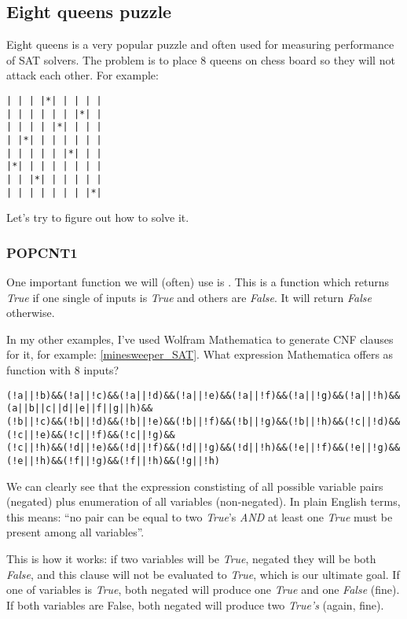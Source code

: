 \subsection{Eight queens puzzle}
\label{EightQueens}

Eight queens is a very popular puzzle and often used for measuring performance of SAT solvers.
The problem is to place 8 queens on chess board so they will not attack each other.
For example:

\begin{lstlisting}
| | | |*| | | | |
| | | | | | |*| |
| | | | |*| | | |
| |*| | | | | | |
| | | | | |*| | |
|*| | | | | | | |
| | |*| | | | | |
| | | | | | | |*|
\end{lstlisting}

Let's try to figure out how to solve it.

\subsubsection{POPCNT1}

One important function we will (often) use is .
This is a function which returns \textit{True} if one single of inputs is \textit{True} and others are \textit{False}.
It will return \textit{False} otherwise.

In my other examples, I've used Wolfram Mathematica to generate CNF clauses for it, for example: \ref{minesweeper_SAT}.
What expression Mathematica offers as  function with 8 inputs?

\begin{lstlisting}
(!a||!b)&&(!a||!c)&&(!a||!d)&&(!a||!e)&&(!a||!f)&&(!a||!g)&&(!a||!h)&&(a||b||c||d||e||f||g||h)&&
(!b||!c)&&(!b||!d)&&(!b||!e)&&(!b||!f)&&(!b||!g)&&(!b||!h)&&(!c||!d)&&(!c||!e)&&(!c||!f)&&(!c||!g)&&
(!c||!h)&&(!d||!e)&&(!d||!f)&&(!d||!g)&&(!d||!h)&&(!e||!f)&&(!e||!g)&&(!e||!h)&&(!f||!g)&&(!f||!h)&&(!g||!h)
\end{lstlisting}

We can clearly see that the expression constisting of all possible variable pairs (negated) plus
enumeration of all variables (non-negated).
In plain English terms, this means: ``no pair can be equal to two \textit{True}'s \textit{AND} at least one \textit{True}
must be present among all variables''.

This is how it works: if two variables will be \textit{True}, negated they will be both \textit{False},
and this clause will not be evaluated
to \textit{True}, which is our ultimate goal.
If one of variables is \textit{True}, both negated will produce one \textit{True} and one \textit{False} (fine).
If both variables are False, both negated will produce two \textit{True's} (again, fine).

